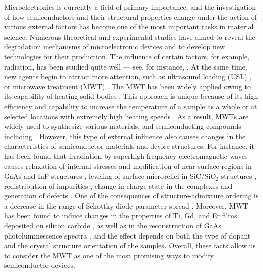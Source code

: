 \documentclass[10pt]{iopart}
\begin{document}
Microelectronics is currently a field of primary importance, and  the investigation of how semiconductors and their structural properties change under the action of various external factors has become one of the most important tasks in material science.
Numerous theoretical and experimental studies have aimed to reveal the degradation mechanisms of microelectronic devices and to develop new technologies for their production.
The influence of certain factors, for example, radiation, has been studied quite well --- see, for instance, \cite{KozlovsEn,RadiationEffectsBook,DefByIon}.
At the same time, new agents begin to attract more attention, such as ultrasound loading (USL) \cite{Olikh2018JAP,Olikh2006TPL},
or microwave treatment (MWT) \cite{MW:Rev,ZOHM2000,BHUNIA1998,Bacherikov2003En,Pashkov1994En,
BoltovetsEn,Milenin1994En,BelyaevIntac,ASHKINADZE1996,ProcSPIE,Belyaev1998JTFEn,
Bacherikov2008En,Konakova2015En,Konakova2012FTPEn}.
The MWT has been widely applied owing to its capability of heating solid bodies \cite{MW:Rev,ZOHM2000}.
This approach is unique because of its high efficiency and capability to increase the temperature
of a sample as a whole or at selected locations with extremely high heating speeds \cite{MW:Rev}.
As a result, MWTs are widely used to synthesize various materials, and semiconducting compounds including \cite{MW:Rev,BHUNIA1998}.
However, this type of external influence also causes changes in the  characteristics of semiconductor materials and device structures.
For instance, it has been found that irradiation by superhigh-frequency electromagnetic waves causes relaxation of internal stresses and modification of near-surface regions
in GaAs and InP structures \cite{BoltovetsEn,Pashkov1994En,Milenin1994En,BelyaevIntac,ProcSPIE,Konakova2015En,Konakova2012FTPEn},
leveling of surface microrelief in SiC/SiO$_2$ structures \cite{Bacherikov2003En},
redistribution of impurities \cite{Bacherikov2003En,Belyaev1998JTFEn,Konakova2015En},
change in charge state in the complexes \cite{Milenin1994En} and generation of defects \cite{Belyaev1998JTFEn}.
One of the consequences of structure-admixture ordering  is a decrease in the range of
Schottky diode parameter spread \cite{Milenin1994En,Belyaev1998JTFEn}.
Moreover, MWT has been found to induce changes in the properties of Ti, Gd, and Er films deposited on silicon carbide \cite{Bacherikov2008En},
as well as in the reconstruction of GaAs photoluminescence spectra \cite{BelyaevIntac,ProcSPIE,Belyaev1998JTFEn},
and the effect depends on both the type of dopant and the crystal structure orientation of the samples.
Overall, these facts allow us to consider the MWT as one of the most promising ways to modify semiconductor devices.
\end{document}
